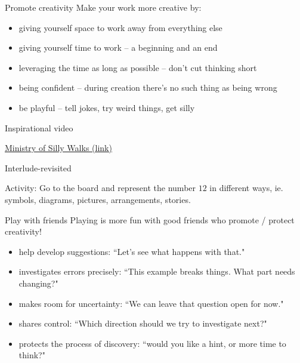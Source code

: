 \documentclass{beamer}
\begin{document}
\begin{frame}{Promote creativity}
\pause
Make your work more creative by:
  \begin{itemize}
\pause
    \item giving yourself space to work away from everything else
\pause
    \item giving yourself time to work -- a beginning and an end
\pause
    \item leveraging the time as long as possible -- don't cut thinking short
\pause
    \item being confident -- during creation there's no such thing as being wrong
\pause
    \item be playful -- tell jokes, try weird things, get silly
  \end{itemize}
\end{frame}

\begin{frame}{Inspirational video}
  \begin{center}
   \href{https://www.youtube.com/watch?v=iV2ViNJFZC8&t=54s}{Ministry of Silly Walks (link)}
  \end{center}
\end{frame}

\begin{frame}{Interlude-revisited}
  \begin{block}{Activity:}
    Go to the board and represent the number $12$ in different ways, ie. symbols, diagrams, pictures, arrangements, stories.
  \end{block}
\end{frame}

\begin{frame}{Play with friends}
\pause
   Playing is more fun with good friends who promote / protect creativity!
  \begin{itemize}
\pause
    \item help develop suggestions: ``Let's see what happens with that."
\pause
    \item investigates errors precisely: ``This example breaks things.  What part needs changing?"
\pause
    \item makes room for uncertainty: ``We can leave that question open for now."
\pause
    \item shares control: ``Which direction should we try to investigate next?"
\pause
    \item protects the process of discovery: ``would you like a hint, or more time to think?"
  \end{itemize}
\end{frame}
\end{document}
